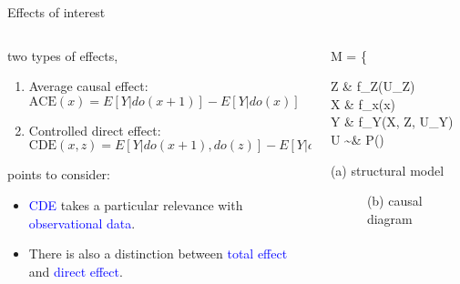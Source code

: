 %
%
\begin{frame}
	{Effects of interest}
	\begin{columns}
		\begin{column}{0.5\textwidth}
			two types of effects,
			\begin{enumerate}
				\item Average causal effect: \\
				$\text{ACE}(x) = E[Y | do(x + 1)] - E[Y | do(x)]$
				\item Controlled direct effect: \\
				$\text{CDE}(x, z) = E[Y | do(x + 1), do(z)] - E[Y | do(x), do(z)]$
			\end{enumerate}
			
			points to consider:
			\begin{itemize}
				\item \textcolor{blue}{CDE} takes a particular relevance with \textcolor{blue}{observational data}.
				\item There is also a distinction between \textcolor{blue}{total effect} and \textcolor{blue}{direct effect}.
			\end{itemize}
		\end{column}
		\begin{column}{0.5\textwidth}  
			\begin{equ}
				M = \left\{ \begin{aligned} 
					Z \leftarrow & \; f_{Z}(U_{Z}) \\
					X \leftarrow & \; f_{x}(x) \\
					Y \leftarrow & \; f_{Y}(X, Z, U_{Y}) \\
					U \sim & \; P()
				\end{aligned} \right
				\caption*{(a) structural model}
			\end{equ}
			\begin{figure}
				\caption*{(b) causal diagram}
			\end{figure}
		\end{column}
	\end{columns}
\end{frame}
%
%
